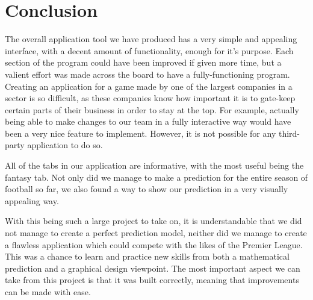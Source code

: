 \documentclass[12pt, a4paper, oneside]{book}
\numberwithin{equation}{section}
\begin{document}
\chapter{Conclusion}\label{ch:concl}

The overall application tool we have produced has a very simple and appealing interface, with a decent amount of functionality, enough for it's purpose. Each section of the program could have been improved if given more time, but a valient effort was made across the board to have a fully-functioning program. Creating an application for a game made by one of the largest companies in a sector is so difficult, as these companies know how important it is to gate-keep certain parts of their business in order to stay at the top.  For example, actually being able to make changes to our team in a fully interactive way would have been a very nice feature to implement. However, it is not possible for any third-party application to do so.

All of the tabs in our application are informative, with the most useful being the fantasy tab. Not only did we manage to make a prediction for the entire season of football so far, we also found a way to show our prediction in a very visually appealing way.

With this being such a large project to take on, it is understandable that we did not manage to create a perfect prediction model, neither did we manage to create a flawless application which could compete with the likes of the Premier League. This was a chance to learn and practice new skills from both a mathematical prediction and a graphical design viewpoint. The most important aspect we can take from this project is that it was built correctly, meaning that improvements can be made with ease.
\end{document}
